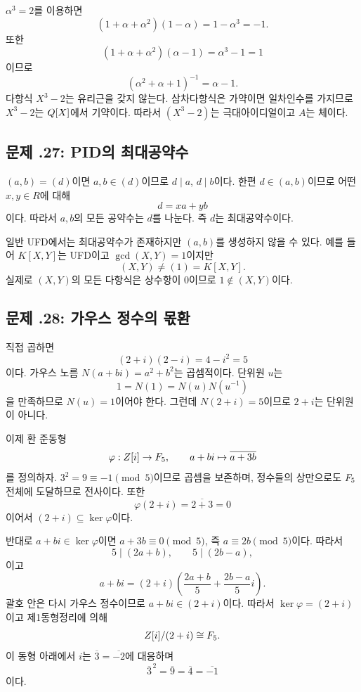 \begin{solution}
$\alpha^3=2$를 이용하면
\[
  (1+\alpha+\alpha^2)(1-\alpha)
  =1-\alpha^3=-1.
\]
또한
\[
  (1+\alpha+\alpha^2)(\alpha-1)
  =\alpha^3-1=1
\]
이므로
\[
  (\alpha^2+\alpha+1)^{-1}=\alpha-1.
\]
다항식 $X^3-2$는 유리근을 갖지 않는다. 삼차다항식은 가약이면 일차인수를 가지므로 $X^3-2$는 $Q[X]$에서 기약이다. 따라서 $(X^3-2)$는 극대아이디얼이고 $A$는 체이다.
\end{solution}

\subsection*{문제 \thechapter.27: PID의 최대공약수}

\begin{solution}
$(a,b)=(d)$이면 $a,b\in(d)$이므로 $d\mid a$, $d\mid b$이다. 한편 $d\in(a,b)$이므로 어떤 $x,y\in R$에 대해
\[
  d=xa+yb
\]
이다. 따라서 $a,b$의 모든 공약수는 $d$를 나눈다. 즉 $d$는 최대공약수이다.

일반 UFD에서는 최대공약수가 존재하지만 $(a,b)$를 생성하지 않을 수 있다. 예를 들어 $K[X,Y]$는 UFD이고 $\gcd(X,Y)=1$이지만
\[
  (X,Y)\ne(1)=K[X,Y].
\]
실제로 $(X,Y)$의 모든 다항식은 상수항이 $0$이므로 $1\notin(X,Y)$이다.
\end{solution}

\subsection*{문제 \thechapter.28: 가우스 정수의 몫환}

\begin{solution}
직접 곱하면
\[
  (2+i)(2-i)=4-i^2=5
\]
이다. 가우스 노름 $N(a+bi)=a^2+b^2$는 곱셈적이다. 단위원 $u$는
\[
  1=N(1)=N(u)N(u^{-1})
\]
을 만족하므로 $N(u)=1$이어야 한다. 그런데 $N(2+i)=5$이므로 $2+i$는 단위원이 아니다.

이제 환 준동형
\[
  \varphi:Z[i]\to F_5,
  \qquad a+bi\mapsto\overline{a+3b}
\]
를 정의하자. $3^2=9\equiv-1\pmod5$이므로 곱셈을 보존하며, 정수들의 상만으로도 $F_5$ 전체에 도달하므로 전사이다. 또한
\[
  \varphi(2+i)=\overline{2+3}=0
\]
이어서 $(2+i)\subseteq\ker\varphi$이다.

반대로 $a+bi\in\ker\varphi$이면 $a+3b\equiv0\pmod5$, 즉 $a\equiv2b\pmod5$이다. 따라서
\[
  5\mid(2a+b),\qquad 5\mid(2b-a),
\]
이고
\[
  a+bi=(2+i)\left(\frac{2a+b}{5}+\frac{2b-a}{5}i\right).
\]
괄호 안은 다시 가우스 정수이므로 $a+bi\in(2+i)$이다. 따라서 $\ker\varphi=(2+i)$이고 제1동형정리에 의해
\[
  Z[i]/(2+i)\cong F_5.
\]
이 동형 아래에서 $i$는 $\overline3=\overline{-2}$에 대응하며
\[
  \overline3^{\,2}=\overline9=\overline4=\overline{-1}
\]
이다.
\end{solution}

